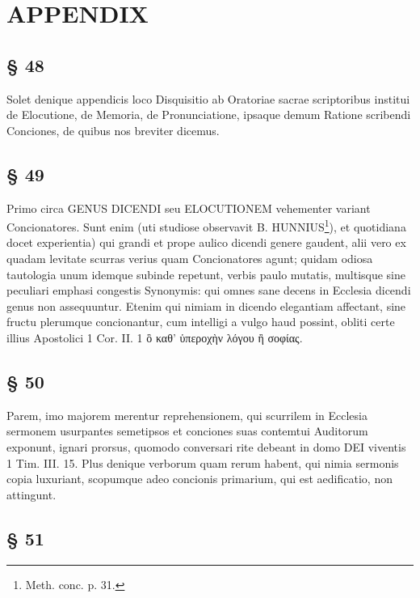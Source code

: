 \section{APPENDIX}

\subsection{§ 48}

Solet denique appendicis loco Disquisitio ab Oratoriae sacrae scriptoribus institui de Elocutione, de
Memoria, de Pronunciatione, ipsaque demum Ratione scribendi Conciones, de quibus nos breviter dicemus.

\subsection{§ 49}

Primo circa GENUS DICENDI seu ELOCUTIONEM vehementer variant Concionatores. Sunt enim (uti studiose observavit B. HUNNIUS\footnote{Meth. conc. p. 31.}), et quotidiana docet experientia) qui grandi et prope aulico dicendi genere gaudent, alii vero ex quadam levitate scurras verius quam Concionatores agunt; quidam odiosa tautologia unum idemque subinde repetunt, verbis paulo mutatis, multisque sine peculiari emphasi congestis Synonymis: qui omnes sane decens in Ecclesia dicendi genus non assequuntur. Etenim qui nimiam in dicendo elegantiam affectant, sine fructu plerumque concionantur, cum intelligi a vulgo haud possint, obliti certe illius Apostolici 1 Cor. II. 1 ὃ καθ’ ὑπεροχὴν λόγου ἢ σοφίας.

\subsection{§ 50}

Parem, imo majorem merentur reprehensionem, qui scurrilem in Ecclesia sermonem usurpantes semetipsos et conciones suas contemtui Auditorum exponunt, ignari prorsus, quomodo conversari rite debeant in domo DEI viventis 1 Tim. III. 15. Plus denique verborum quam rerum habent, qui nimia sermonis copia luxuriant, scopumque adeo concionis primarium, qui est aedificatio, non attingunt.

\subsection{§ 51}

